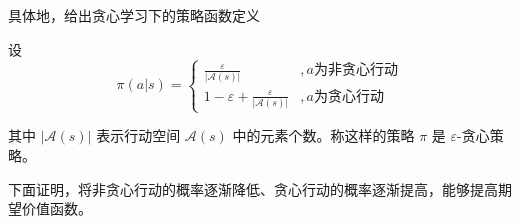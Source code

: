 具体地，给出贪心学习下的策略函数定义

\begin{Definition}
    设
    \begin{equation}
        \pi(a|s)=
        \begin{cases}
            \frac{\varepsilon}{|\mathcal A(s)|}&, a\text{为非贪心行动}\\
            1-\varepsilon+\frac{\varepsilon}{|\mathcal A(s)|}&, a\text{为贪心行动}
        \end{cases}
    \end{equation}

其中 $|\mathcal{A}(s)|$ 表示行动空间 $\mathcal{A}(s)$ 中的元素个数。称这样的策略 $\pi$ 是 $\varepsilon$-贪心策略。
\end{Definition}

下面证明，将非贪心行动的概率逐渐降低、贪心行动的概率逐渐提高，能够提高期望价值函数。

